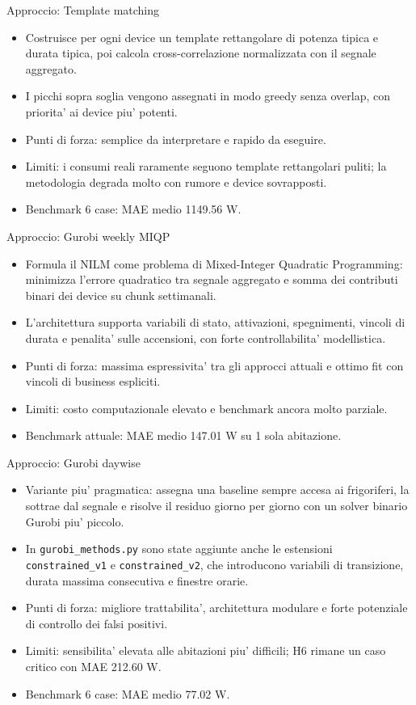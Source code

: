 \documentclass[aspectratio=169]{beamer}
\newcommand{\code}[1]{\texttt{#1}}
\begin{document}
\begin{frame}{Approccio: Template matching}
\small
\begin{itemize}
  \item Costruisce per ogni device un template rettangolare di potenza tipica e durata tipica, poi calcola cross-correlazione normalizzata con il segnale aggregato.
  \item I picchi sopra soglia vengono assegnati in modo greedy senza overlap, con priorita' ai device piu' potenti.
  \item Punti di forza: semplice da interpretare e rapido da eseguire.
  \item Limiti: i consumi reali raramente seguono template rettangolari puliti; la metodologia degrada molto con rumore e device sovrapposti.
  \item Benchmark 6 case: MAE medio 1149.56 W.
\end{itemize}
\end{frame}

\begin{frame}{Approccio: Gurobi weekly MIQP}
\small
\begin{itemize}
  \item Formula il NILM come problema di Mixed-Integer Quadratic Programming: minimizza l'errore quadratico tra segnale aggregato e somma dei contributi binari dei device su chunk settimanali.
  \item L'architettura supporta variabili di stato, attivazioni, spegnimenti, vincoli di durata e penalita' sulle accensioni, con forte controllabilita' modellistica.
  \item Punti di forza: massima espressivita' tra gli approcci attuali e ottimo fit con vincoli di business espliciti.
  \item Limiti: costo computazionale elevato e benchmark ancora molto parziale.
  \item Benchmark attuale: MAE medio 147.01 W su 1 sola abitazione.
\end{itemize}
\end{frame}

\begin{frame}{Approccio: Gurobi daywise}
\small
\begin{itemize}
  \item Variante piu' pragmatica: assegna una baseline sempre accesa ai frigoriferi, la sottrae dal segnale e risolve il residuo giorno per giorno con un solver binario Gurobi piu' piccolo.
  \item In \code{gurobi\_methods.py} sono state aggiunte anche le estensioni \code{constrained\_v1} e \code{constrained\_v2}, che introducono variabili di transizione, durata massima consecutiva e finestre orarie.
  \item Punti di forza: migliore trattabilita', architettura modulare e forte potenziale di controllo dei falsi positivi.
  \item Limiti: sensibilita' elevata alle abitazioni piu' difficili; H6 rimane un caso critico con MAE 212.60 W.
  \item Benchmark 6 case: MAE medio 77.02 W.
\end{itemize}
\end{frame}
\end{document}
